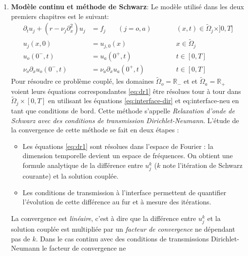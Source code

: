 \begin{enumerate}
\item \textbf{Modèle continu et méthode de Schwarz}:
Le modèle utilisé dans les deux premiers chapitres est le
suivant:
\begin{subequations}
\begin{align}
\partial_t u_j +( r - \nu_j \partial_x^2) u_j &= f_j ~~~~~~~~
(j=o,a) &\qquad&
	(x,t) \in \widetilde{\Omega}_j \times ]0,T] \label{eq:dr1} \\
u_j(x,0) &= u_{j,0}(x)   &\qquad&  x \in \widetilde{\Omega}_j  \\
u_o(0^-,t) &=  u_a(0^+,t) &\qquad& t \in [0,T] \label{eq:interface-dir} \\
\nu_o \partial_x u_o(0^-,t) &= \nu_a \partial_x u_a(0^+,t) &\qquad& t \in [0,T] \label{eq:interface-neu} 
\end{align}
\label{eq:resume_francais_model-problem}
\end{subequations}
Pour résoudre ce problème couplé, les domaines
$\widetilde{\Omega}_o = \mathbb{R_{-}}$ et
et $\widetilde{\Omega}_a = \mathbb{R_{+}}$ voient leurs équations
correspondantes \eqref{eq:dr1} être résolues tour à tour
dans $\widetilde{\Omega}_j \times [0,T]$
en utilisant les équations
\eqref{eq:interface-dir} et {eq:interface-neu}
en tant que conditions de bord.
Cette méthode s'appelle \textit{Relaxation d'onde de Schwarz avec
des conditions de transmission Dirichlet-Neumann}.
L'étude de la convergence de cette méthode se fait en deux étapes :
\begin{itemize}
\item Les équations \eqref{eq:dr1} sont résolues dans l'espace de
	Fourier : la dimension temporelle devient un espace
	de fréquences. On obtient une formule analytique de
	la différence entre $u_j^k$
	($k$ note l'itération de Schwarz courante)
	et la solution couplée.
\item Les conditions de transmission à l'interface permettent
	de quantifier l'évolution de cette différence au fur et
	à mesure des itérations.
\end{itemize}
 La convergence est \textit{linéaire},
 c'est à dire que la différence entre $u_j^k$ et la solution couplée
 est multipliée par un \textit{facteur de convergence} ne dépendant
 pas de $k$. Dans le cas continu avec des conditions
 de transmissions Dirichlet-Neumann le facteur de convergence ne

\end{enumerate}
